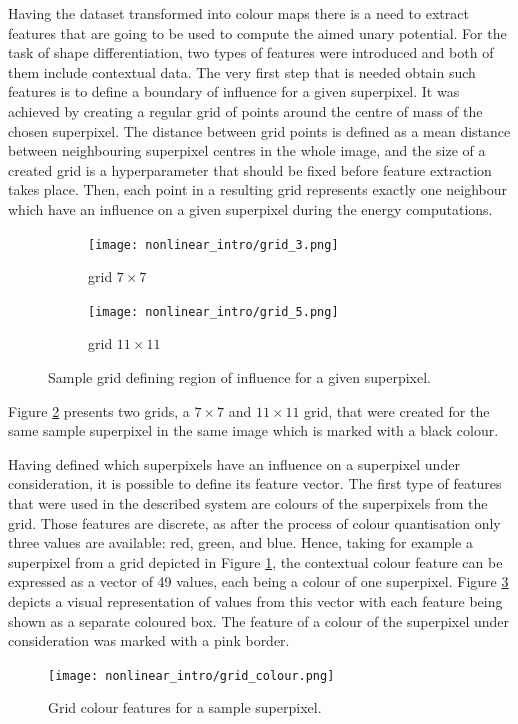 Having the dataset transformed into colour maps there is a need to extract features that are going to be used to compute the aimed unary potential. For the task of shape differentiation, two types of features were introduced and both of them include contextual data. The very first step that is needed obtain such features is to define a boundary of influence for a given superpixel. It was achieved by creating a regular grid of points around the centre of mass of the chosen superpixel. The distance between grid points is defined as a mean distance between neighbouring superpixel centres in the whole image, and the size of a created grid is a hyperparameter that should be fixed before feature extraction takes place. Then, each point in a resulting grid represents exactly one neighbour which have an influence on a given superpixel during the energy computations.
\begin{figure}[ht]
    \centering
    \begin{subfigure}[h]{0.40\textwidth}
        \texttt{[image: nonlinear\_intro/grid\_3.png]}
        \caption{grid $7 \times 7$}
        \label{fig:grid_7_7}
      \end{subfigure}
    \begin{subfigure}[h]{0.40\textwidth}
        \texttt{[image: nonlinear\_intro/grid\_5.png]}
        \caption{grid $11 \times 11$}
      \end{subfigure}
    \caption{Sample grid defining region of influence for a given superpixel.}
    \label{fig:nonlinear_grid}
\end{figure}
Figure \ref{fig:nonlinear_grid} presents two grids, a $7 \times 7$ and $11 \times 11$ grid, that were created for the same sample superpixel in the same image which is marked with a black colour.

Having defined which superpixels have an influence on a superpixel under consideration, it is possible to define its feature vector. The first type of features that were used in the described system are colours of the superpixels from the grid. Those features are discrete, as after the process of colour quantisation only three values are available: red, green, and blue. Hence, taking for example a superpixel from a grid depicted in Figure \ref{fig:grid_7_7}, the contextual colour feature can be expressed as a vector of 49 values, each being a colour of one superpixel. Figure \ref{fig:grid_colour} depicts a visual representation of values from this vector with each feature being shown as a separate coloured box. The feature of a colour of the superpixel under consideration was marked with a pink border.
\begin{figure}[ht]
    \centering
    \texttt{[image: nonlinear\_intro/grid\_colour.png]}
    \caption{Grid colour features for a sample superpixel.}
    \label{fig:grid_colour}
\end{figure}

